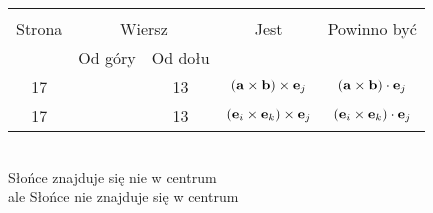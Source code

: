 \documentclass[a4paper,11pt]{article}
\begin{document}
\begin{center}

  \begin{tabular}{|c|c|c|c|c|}
    \hline
    & \multicolumn{2}{c|}{} & & \\
    Strona & \multicolumn{2}{c|}{Wiersz} & Jest
                              & Powinno być \\ \cline{2-3}
    & Od góry & Od dołu &  &  \\ \hline
    17 & & 13 & $( \mathbf{a} \times \mathbf{b} ) \times \mathbf{e}_{ j }$
           & $( \mathbf{a} \times \mathbf{b} ) \cdot \mathbf{e}_{ j }$ \\
    17 & & 13 & $( \mathbf{e}_{ i } \times \mathbf{e}_{ k } ) \times \mathbf{e}_{ j }$
           & $( \mathbf{e}_{ i } \times \mathbf{e}_{ k } ) \cdot \mathbf{e}_{ j }$ \\
    \hline
  \end{tabular}

\end{center}

\vspace{\spaceTwo}


\noindent
{} \\
\Jest  Słońce znajduje się nie w centrum \\
\Powin ale Słońce nie znajduje się w centrum \\















{}






\end{document}
